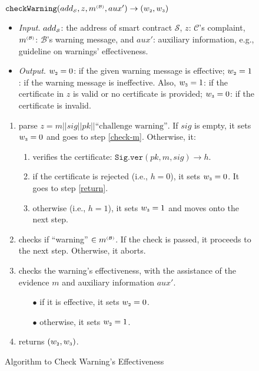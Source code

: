 \begin{figure}[!htbp]
\setlength{\fboxsep}{1pt}
\begin{center}
    \begin{tcolorbox}[enhanced,width=5.5in,
    drop fuzzy shadow southwest,
    colframe=red!50!black,colback=yellow!10]
    \small{
    \vspace{-1.2mm}
 \underline{$\mathtt{checkWarning}(add_{\scriptscriptstyle\mathcal{S}}, z, m^{\scriptscriptstyle\mathcal{(B)}},  aux')\rightarrow (w_{\scriptscriptstyle 2},  w_{\scriptscriptstyle 3})$}\\
%
\vspace{-2mm}
\begin{itemize}
%
\item \noindent\textit{Input}. $add_{\scriptscriptstyle\mathcal{S}}$: the address of smart contract $\mathcal{S}$, $z$:  $\mathcal{C}$'s complaint, $m^{\scriptscriptstyle\mathcal{(B)}}$:  $\mathcal{B}$'s warning message,  and $aux'$: auxiliary information, e.g., guideline on warnings' effectiveness. 
%
\item\noindent\textit{Output}. $w_{\scriptscriptstyle 2}=0$: if the given warning message is effective; $w_{\scriptscriptstyle 2}=1$: if the  warning message is ineffective. Also, $w_{\scriptscriptstyle 3}=1$: if the certificate in $z$ is valid or no certificate is provided; $ w_{\scriptscriptstyle 3}=0$: if the certificate is invalid. 
%
\end{itemize}
%
\begin{enumerate}
%
\item parse $z= m||sig||pk||\text{``challenge warning''}$. If  $sig$ is  empty,  it  sets $w_{\scriptscriptstyle 3}=0$ and goes to  step \ref{check-m}. Otherwise, it:
%
\begin{enumerate} 
%
\item verifies the certificate: $\mathtt{Sig.ver}(pk, m, sig)\rightarrow h$. 
%
\item if  the certificate is rejected (i.e., $h=0$),  it sets $w_{\scriptscriptstyle 3}=0$. It  goes to step \ref{return}. 
%
\item otherwise (i.e., $h=1$), it sets $w_{\scriptscriptstyle 3}=1$ and moves onto the next step. 
\end{enumerate}
%
%
\item\label{check-m} checks if ``warning'' $\in m^{\scriptscriptstyle\mathcal{(B)}}$.  If the check is passed, it proceeds to the next step. Otherwise, it aborts. 
%
\item checks the warning's effectiveness, with the assistance of the evidence $m$ and auxiliary information $aux'$. 
%
\begin{itemize}
\item[$\bullet$]  if it is effective,  it sets $w_{\scriptscriptstyle 2} = 0$.
\item [$\bullet$] otherwise, it sets $w_{\scriptscriptstyle 2} = 1$.
\end{itemize}
\item\label{return} returns $(w_{\scriptscriptstyle 2}, w_{\scriptscriptstyle 3})$.
\vspace{-1mm}
\end{enumerate}
}   
\end{tcolorbox}
\end{center}
\caption{Algorithm to Check Warning's Effectiveness} 
\label{fig:checkWarning}
\end{figure}


